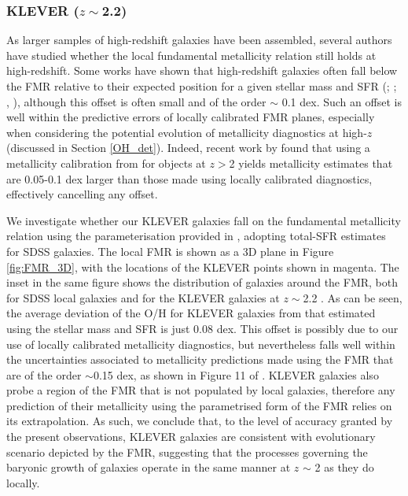 \documentclass[usenatbib]{mnras} %
\begin{document}

\subsubsection{KLEVER ($z\sim$2.2)}

As larger samples of high-redshift galaxies have been assembled, several authors have studied whether the local fundamental metallicity relation still holds at high-redshift. Some works have shown that high-redshift galaxies often fall below the FMR relative to their expected position for a given stellar mass and SFR (\citealt{Cullen_2014}; \citealt{Troncoso_2014}; \citealt{Sanders_2015}, \citeyear{Sanders_2018}), although this offset is often small and of the order $\sim$ 0.1 dex. Such an offset is well within the predictive errors of locally calibrated FMR planes, especially when considering the potential evolution of metallicity diagnostics at high-$z$ (discussed in Section \ref{OH_det}). Indeed, recent work by \cite{Sanders_2020FMR} found that using a metallicity calibration from \cite{Bian_2018} for objects at $z>$2 yields metallicity estimates that are 0.05-0.1 dex larger than those made using locally calibrated diagnostics, effectively cancelling any offset.

We investigate whether our KLEVER galaxies fall on the fundamental metallicity relation using the parameterisation provided in \cite{Curti_2020FMR}, adopting total-SFR estimates for SDSS galaxies. The local FMR is shown as a 3D plane in Figure \ref{fig:FMR_3D}, with the locations of the KLEVER points shown in magenta. The inset in the same figure shows the distribution of galaxies around the FMR, both for SDSS local galaxies and for the KLEVER galaxies at $z\sim$2.2 . As can be seen, the average deviation of the O/H for KLEVER galaxies from that estimated using the stellar mass and SFR is just 0.08 dex. This offset is possibly due to our use of locally calibrated metallicity diagnostics, but nevertheless falls well within the uncertainties associated to metallicity predictions made using the FMR that are of the order $\sim$0.15 dex, as shown in Figure 11 of \cite{Curti_2020FMR}. KLEVER galaxies also probe a region of the FMR that is not populated by local galaxies, therefore any prediction of their metallicity using the parametrised form of the FMR relies on its extrapolation. As such, we conclude that, to the level of accuracy granted by the present observations, KLEVER galaxies are consistent with evolutionary scenario depicted by the FMR, suggesting that the processes governing the baryonic growth of galaxies operate in the same manner at $z$ $\sim$ 2 as they do locally.
\end{document}
